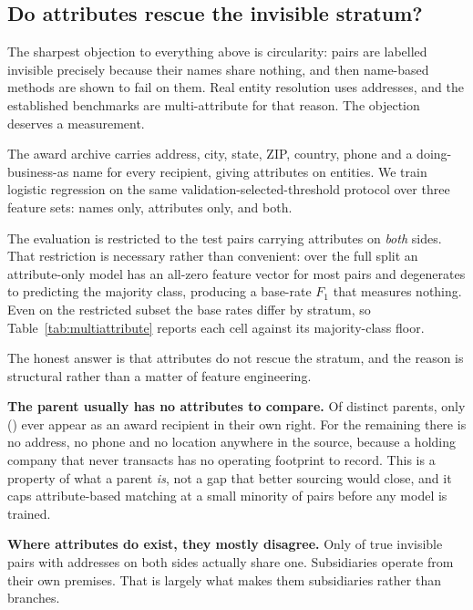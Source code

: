 \subsection{Do attributes rescue the invisible stratum?}
\label{sec:attributes}

The sharpest objection to everything above is circularity: pairs are labelled invisible
precisely because their names share nothing, and then name-based methods are shown to fail
on them. Real entity resolution uses addresses, and the established benchmarks are
multi-attribute for that reason. The objection deserves a measurement.

The award archive carries address, city, state, ZIP, country, phone and a
doing-business-as name for every recipient, giving attributes on \AttrEntities entities.
We train logistic regression on the same validation-selected-threshold protocol over
three feature sets: names only, attributes only, and both.

The evaluation is restricted to the \AttrSubsetTest test pairs carrying attributes on
\emph{both} sides. That restriction is necessary rather than convenient: over the full
split an attribute-only model has an all-zero feature vector for most pairs and
degenerates to predicting the majority class, producing a base-rate $F_1$ that measures
nothing. Even on the restricted subset the base rates differ by stratum, so
Table~\ref{tab:multiattribute} reports each cell against its majority-class floor.



The honest answer is that attributes do not rescue the stratum, and the reason is
structural rather than a matter of feature engineering.

\textbf{The parent usually has no attributes to compare.} Of \ParentsTotal distinct
parents, only \ParentsTransacting (\ParentsTransactingPct) ever appear as an award
recipient in their own right. For the remaining \ParentsNoFootprintPct there is no
address, no phone and no location anywhere in the source, because a holding company that
never transacts has no operating footprint to record. This is a property of what a parent
\emph{is}, not a gap that better sourcing would close, and it caps attribute-based
matching at a small minority of pairs before any model is trained.

\textbf{Where attributes do exist, they mostly disagree.} Only
\AttrInvisibleSameAddrPct of true invisible pairs with addresses on both sides actually
share one. Subsidiaries operate from their own premises. That is largely what makes
them subsidiaries rather than branches.

